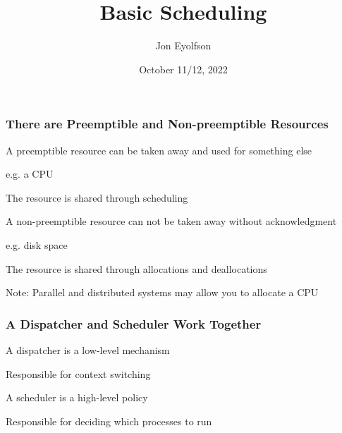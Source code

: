 

\title{Basic Scheduling}
\author{Jon Eyolfson}
\date{October 11/12, 2022}


  \begin{frame}
    \titlepage
  \end{frame}

  \begin{frame}
    \frametitle{There are Preemptible and Non-preemptible Resources}

    A preemptible resource can be taken away and used for something else

    \hspace{2em} e.g. a CPU

    \vspace{2em}

    The resource is shared through scheduling

    \vspace{4em}

    A non-preemptible resource can not be taken away without acknowledgment

    \hspace{2em} e.g. disk space

    \vspace{2em}

    The resource is shared through allocations and deallocations

    \hspace{2em} Note: Parallel and distributed systems may allow you to allocate a CPU
  \end{frame}

  \begin{frame}
    \frametitle{A Dispatcher and Scheduler Work Together}

    A dispatcher is a low-level mechanism

    \hspace{2em} Responsible for context switching

    \vspace{2em}

    A scheduler is a high-level policy

    \hspace{2em} Responsible for deciding which processes to run
  \end{frame}

